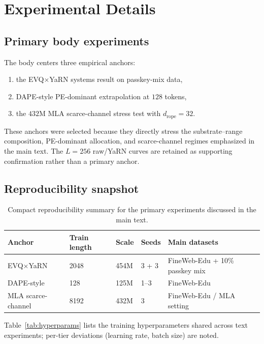 \section{Experimental Details}

\subsection{Primary body experiments}

The body centers three empirical anchors:
\begin{enumerate}
\item the EVQ\(\times\)YaRN systems result on passkey-mix data,
\item DAPE-style PE-dominant extrapolation at \(128\) tokens,
\item the \(432\)M MLA scarce-channel stress test with \(d_{\mathrm{rope}}=32\).
\end{enumerate}
These anchors were selected because they directly stress the substrate--range composition, PE-dominant allocation, and scarce-channel regimes emphasized in the main text. The \(L=256\) raw/YaRN curves are retained as supporting confirmation rather than a primary anchor.

\subsection{Reproducibility snapshot}

\begin{table}[ht]
\caption{Compact reproducibility summary for the primary experiments discussed in the main text.}
\centering
\small
\begin{tabular}{@{}lllll@{}}
\toprule
Anchor & Train length & Scale & Seeds & Main datasets \\
\midrule
EVQ\(\times\)YaRN & 2048 & 454M & 3 + 3 & FineWeb-Edu + 10\% passkey mix \\
DAPE-style & 128 & 125M & 1--3 & FineWeb-Edu \\
MLA scarce-channel & 8192 & 432M & 3 & FineWeb-Edu / MLA setting \\
\bottomrule
\end{tabular}
\end{table}

Table~\ref{tab:hyperparams} lists the training hyperparameters shared across text experiments; per-tier deviations (learning rate, batch size) are noted.

